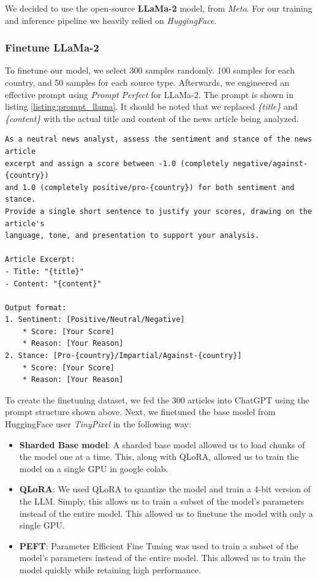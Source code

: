 \documentclass{article}
\theoremstyle{mytheoremstyle}
\theoremstyle{mytheoremstyle}
\theoremstyle{myproblemstyle}
\begin{document}
    We decided to use the open-source \textbf{LLaMa-2} model, from \emph{Meta}. For our training and inference pipeline we heavily relied on \emph{HuggingFace}. \cite{touvron2023llama}

    \subsubsection{Finetune LLaMa-2}

    To finetune our model, we select 300 samples randomly. 100 samples for each country, and 50 samples for each source type. Afterwards, we engineered an effective prompt using \emph{Prompt Perfect} for LLaMa-2. The prompt is shown in listing \ref{listing:prompt_llama}. It should be noted that we replaced \emph{\{title\}} and \emph{\{content\}} with the actual title and content of the news article being analyzed.

    \begin{lstlisting}[caption=Prompt for LLaMa, label={listing:prompt_llama}]
As a neutral news analyst, assess the sentiment and stance of the news article
excerpt and assign a score between -1.0 (completely negative/against-{country}) 
and 1.0 (completely positive/pro-{country}) for both sentiment and stance. 
Provide a single short sentence to justify your scores, drawing on the article's
language, tone, and presentation to support your analysis.

Article Excerpt:
- Title: "{title}"
- Content: "{content}"

Output format: 
1. Sentiment: [Positive/Neutral/Negative]
    * Score: [Your Score]
    * Reason: [Your Reason] 
2. Stance: [Pro-{country}/Impartial/Against-{country}]
    * Score: [Your Score]
    * Reason: [Your Reason]
    \end{lstlisting}
    
    To create the finetuning dataset, we fed the 300 articles into ChatGPT using the prompt structure shown above. Next, we finetuned the base model from HuggingFace user \emph{TinyPixel} in the following way:

    \begin{itemize}
        \item \textbf{Sharded Base model}: A sharded base model allowed us to load chunks of the model one at a time. This, along with QLoRA, allowed us to train the model on a single GPU in google colab.
        \item \textbf{QLoRA}: We used QLoRA to quantize the model and train a 4-bit version of the LLM. Simply, this allows us to train a subset of the model's parameters instead of the entire model. This allowed us to finetune the model with only a single GPU. \cite{dettmers2023qlora}
        \item \textbf{PEFT}: Parameter Efficient Fine Tuning was used to train a subset of the model's parameters instead of the entire model. This allowed us to train the model quickly while retaining high performance.
    \end{itemize}
\end{document}
